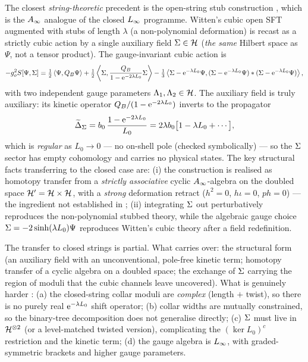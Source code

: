 The closest \emph{string-theoretic} precedent is the open-string stub construction
\cite{ErbinFirat2023}, which is the $A_\infty$ analogue of the closed $L_\infty$ programme. Witten's
cubic open SFT augmented with stubs of length $\lambda$ (a non-polynomial deformation) is recast
as a strictly cubic action by a single auxiliary field $\Sigma\in\mathcal{H}$ (\emph{the same} Hilbert
space as $\Psi$, not a tensor product). The gauge-invariant cubic action is
\begin{equation}
	-g_o^2 S[\Psi,\Sigma]
	= \tfrac12\left \langle \Psi,Q_B\Psi \right \rangle
	+ \tfrac12\left \langle \Sigma,\frac{Q_B}{1-\mathrm{e}^{-2\lambda L_0}}\Sigma \right \rangle
	- \tfrac13\left \langle \Sigma-\mathrm{e}^{-\lambda L_0}\Psi,
	(\Sigma-\mathrm{e}^{-\lambda L_0}\Psi)*(\Sigma-\mathrm{e}^{-\lambda L_0}\Psi) \right \rangle,
	\label{ov:eq:stubaction}
\end{equation}
with two independent gauge parameters $\Lambda_1,\Lambda_2\in\mathcal{H}$. The auxiliary field is
truly auxiliary: its kinetic operator $Q_B/(1-\mathrm{e}^{-2\lambda L_0})$ inverts to the propagator
\begin{equation}
	\widetilde\Delta_\Sigma = b_0\,\frac{1-\mathrm{e}^{-2\lambda L_0}}{L_0}
	= 2\lambda b_0\big[1-\lambda L_0+\cdots\big],
	\label{ov:eq:stubprop}
\end{equation}
which is \emph{regular} as $L_0\to0$ --- no on-shell pole (checked symbolically) ---
so the $\Sigma$ sector has empty cohomology and carries no physical states. The key structural
facts transferring to the closed case are: (i) the construction is realised as homotopy transfer
from a \emph{strictly associative} cyclic $A_\infty$-algebra on the doubled space
$\mathcal{H}'=\mathcal{H}\times\mathcal{H}$, with a \emph{strong} deformation retract
($h^2=0$, $h\iota=0$, $ph=0$) --- the ingredient not established in
\cite{SchnablStettinger2023}; (ii) integrating $\Sigma$ out perturbatively
reproduces the non-polynomial stubbed theory, while the algebraic gauge choice
$\Sigma=-2\sinh(\lambda L_0)\Psi$ reproduces Witten's cubic theory after a field redefinition.

The transfer to closed strings is partial. What carries over: the structural form (an auxiliary
field with an unconventional, pole-free kinetic term; homotopy transfer of a cyclic algebra on a
doubled space; the exchange of $\Sigma$ carrying the region of moduli that the cubic channels leave uncovered). What is genuinely harder
\cite{ErbinFirat2023}: (a) the closed-string collar moduli are \emph{complex} (length $+$ twist),
so there is no purely real $\mathrm{e}^{-\lambda L_0}$ shift operator; (b) collar widths are mutually
constrained, so the binary-tree decomposition does not generalise directly; (c) $\Sigma$ must live
in $\mathcal{H}^{\otimes2}$ (or a level-matched twisted version), complicating the $(\ker L_0)^c$
restriction and the kinetic term; (d) the gauge algebra is $L_\infty$, with graded-symmetric
brackets and higher gauge parameters.

